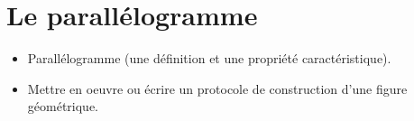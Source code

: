 \themaG
\graphicspath{{../../S21_Le_parallelogramme/Images/}}

\chapter{Le parallélogramme}
\label{S21}


\begin{prerequis}
   \begin{itemize}
      \item Parallélogramme (une définition et une propriété caractéristique).
      \item[\com] Mettre en oeuvre ou écrire un protocole de construction d’une figure géométrique.
   \end{itemize}
\end{prerequis}

\vfill

